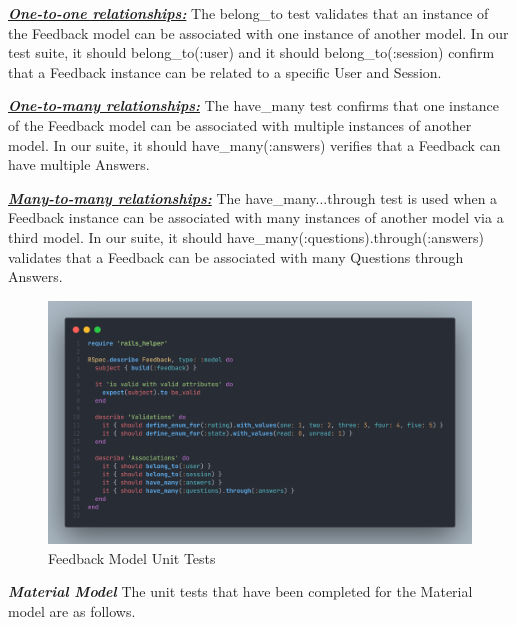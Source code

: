 \begin{justify}
\clearpage
\vspace{0.25cm}
\noindent\textbf{\textit{\underline{One-to-one relationships:}}} The belong\_to test validates that an instance of the Feedback model can be associated with one instance of another model. In our test suite, it { should belong\_to(:user) } and it { should belong\_to(:session) } confirm that a Feedback instance can be related to a specific User and Session.

\vspace{0.25cm}
\noindent\textbf{\textit{\underline{One-to-many relationships:}}} The have\_many test confirms that one instance of the Feedback model can be associated with multiple instances of another model. In our suite, it { should have\_many(:answers) } verifies that a Feedback can have multiple Answers.

\vspace{0.25cm}
\noindent\textbf{\textit{\underline{Many-to-many relationships:}}} The have\_many...through test is used when a Feedback instance can be associated with many instances of another model via a third model. In our suite, it { should have\_many(:questions).through(:answers) } validates that a Feedback can be associated with many Questions through Answers.

    \begin{figure}[H]
        \centerline{\includegraphics[width=140mm,scale=1]{figures/implementation_and_testing/testing/AUT/feedback/all.png}}
        \caption{Feedback Model Unit Tests}
        \label{Feedback Model Unit Tests}
    \end{figure}



\clearpage
\newendline \textbf{\textit{Material Model}}\newendline
The unit tests that have been completed for the Material model are as follows.


\end{justify}
